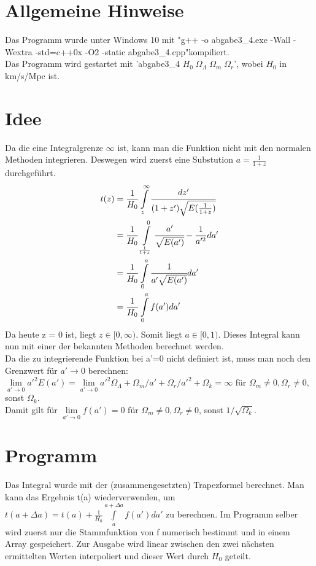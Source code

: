 \documentclass{scrreprt}
\begin{document}
\section*{Allgemeine Hinweise}
Das Programm wurde unter Windows 10 mit "g++ -o abgabe3\_4.exe -Wall -Wextra -std=c++0x -O2 -static abgabe3\_4.cpp"\;kompiliert.\\
Das Programm wird gestartet mit 'abgabe3\_4 $H_0\;\Omega_{\Lambda}\;\Omega_{m}\;\Omega_{r}$', wobei $H_0$ in km/s/Mpc ist. 

\section*{Idee}
Da die eine Integralgrenze $\infty$ ist, kann man die Funktion nicht mit den normalen Methoden integrieren. Deswegen wird zuerst eine Substution $a = \frac{1}{1+z}$ durchgeführt.
\begin{align}
t(z) &= \frac{1}{H_0} \int\limits_z^\infty \cfrac{dz'}{(1+z')\sqrt{E(\frac{1}{1+z})}}\\
     &= \frac{1}{H_0} \int\limits_\frac{1}{1+z}^0 \cfrac{a'}{\sqrt{E(a')}} -\frac{1}{a'^2} da'\\
     &= \frac{1}{H_0} \int\limits_0^a \cfrac{1}{a'\sqrt{E(a')}} da'\\
     &= \frac{1}{H_0} \int\limits_0^a f(a') da'
\end{align}
Da heute z = 0 ist, liegt $z \in [0,\infty)$. Somit liegt $a \in [0,1)$. Dieses Integral kann nun mit einer der bekannten Methoden berechnet werden.\\

Da die zu integrierende Funktion bei a'=0 nicht definiert ist, muss man noch den Grenzwert für $a' \to 0$ berechnen:\\
$\lim\limits_{a'\to 0} a'^2 E(a') = \lim\limits_{a'\to 0} a'^2 \Omega_\Lambda + \Omega_m/a' + \Omega_r/a'^2 + \Omega_k = \infty$ für $\Omega_m \neq 0, \Omega_r \neq 0$, sonst $\Omega_k$.\\
Damit gilt für $\lim\limits_{a'\to 0} f(a') = 0$ für $\Omega_m \neq 0, \Omega_r \neq 0$, sonst $1/\sqrt{\Omega_k}$.\\ 

\section*{Programm}
Das Integral wurde mit der (zusammengesetzten) Trapezformel berechnet. Man kann das Ergebnis t(a) wiederverwenden, um $t(a+\Delta a) = t(a) + \frac{1}{H_0} \int\limits_a^{a+\Delta a} f(a') da'$ zu berechnen. Im Programm selber wird zuerst nur die Stammfunktion von f numerisch bestimmt und in einem Array gespeichert. Zur Ausgabe wird linear zwischen den zwei nächsten ermittelten Werten interpoliert und dieser Wert durch $H_0$ geteilt.
\end{document}
